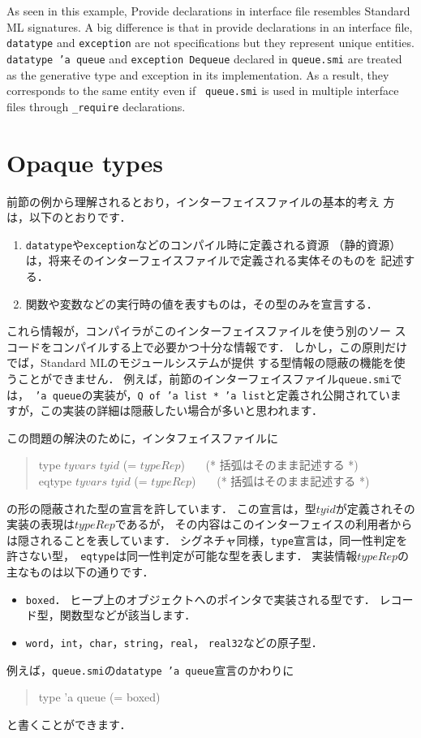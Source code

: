 \documentclass{jbook}
\newcommand{\txt}[2]{#2}
\newenvironment{program}{\begin{tt}\begin{quote}}{\end{quote}\end{tt}}
\begin{document}
	As seen in this example, Provide declarations in interface file
resembles Standard ML signatures.
	A big difference is that in provide declarations in an interface
file, {\tt datatype} and {\tt exception} are not specifications but they
represent unique entities.
	{\tt datatype 'a queue} and {\tt exception Dequeue} declared in
{\tt queue.smi} are treated as the generative type and exception in its
implementation.
	As a result, they corresponds to the same entity even if {\tt
queue.smi} is used in multiple interface files through  {\tt \_require}
declarations.

\fi%

\section{\txt{型の隠蔽}{Opaque types}}
\label{sec:tutorialOpaqueTypeInterface}

\ifx\jp%
	前節の例から理解されるとおり，インターフェイスファイルの基本的考え
方は，以下のとおりです．
\begin{enumerate}
\item {\tt datatype}や{\tt exception}などのコンパイル時に定義される資源
（静的資源）は，将来そのインターフェイスファイルで定義される実体そのものを
記述する．
\item 関数や変数などの実行時の値を表すものは，その型のみを宣言する．
\end{enumerate}
	これら情報が，コンパイラがこのインターフェイスファイルを使う別のソー
スコードをコンパイルする上で必要かつ十分な情報です．
	しかし，この原則だけでば，Standard MLのモジュールシステムが提供
する型情報の隠蔽の機能を使うことができません．
	例えば，前節のインターフェイスファイル{\tt queue.smi}では，{\tt
'a queue}の実装が，{\tt Q of 'a list * 'a list}と定義され公開されていま
すが，この実装の詳細は隠蔽したい場合が多いと思われます．

	この問題の解決のために，インタフェイスファイルに
\begin{program}
type $tyvars$ $tyid$ (= $typeRep$) \ \ \ (* 括弧はそのまま記述する *)\\
eqtype $tyvars$ $tyid$ (= $typeRep$) \ \ \ (* 括弧はそのまま記述する *)
\end{program}
の形の隠蔽された型の宣言を許しています．
	この宣言は，型$tyid$が定義されその実装の表現は$typeRep$であるが，
その内容はこのインターフェイスの利用者からは隠されることを表しています．
	シグネチャ同様，{\tt type}宣言は，同一性判定を許さない型，{\tt
eqtype}は同一性判定が可能な型を表します．
	実装情報$typeRep$の主なものは以下の通りです．
\begin{itemize}
\item {\tt boxed}．
	ヒープ上のオブジェクトへのポインタで実装される型です．
	レコード型，関数型などが該当します．
\item {\tt word}，{\tt int}，{\tt char}，{\tt string}，{\tt real}，
{\tt real32}などの原子型．
\end{itemize}
	例えば，{\tt queue.smi}の{\tt datatype 'a queue}宣言のかわりに
\begin{program}
type 'a queue (= boxed)
\end{program}
と書くことができます．
\end{document}
